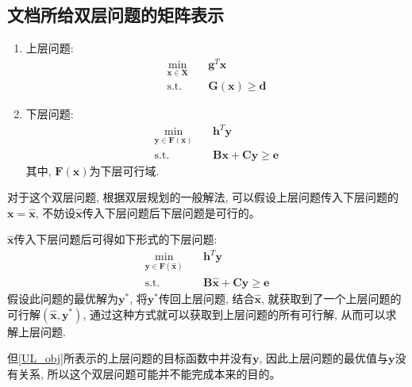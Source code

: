 \documentclass{article}
\begin{document}
\subsection{文档所给双层问题的矩阵表示}
\begin{enumerate}
    \item {上层问题:
        \begin{align}
            \min\limits_{\boldsymbol{x}\in\boldsymbol{X}}\quad & \boldsymbol{g}^T\boldsymbol{x}  \label{UL_obj} \\
            \mathrm{s.t.}\quad &\boldsymbol{G(x)}\geq \boldsymbol{d}  \label{UL_con1} 
        \end{align}
    }
    \item {下层问题:
        \begin{align}
            \min\limits_{\boldsymbol{y}\in\boldsymbol{F(x)}}\quad & \boldsymbol{h}^T\boldsymbol{y} \\
            \mathrm{s.t.}\quad &\boldsymbol{Bx}+\boldsymbol{Cy}\geq \boldsymbol{e}
        \end{align}
        其中, $\boldsymbol{F(x)}$为下层可行域.
    }
\end{enumerate}

对于这个双层问题, 根据双层规划的一般解法, 可以假设上层问题传入下层问题的$\boldsymbol{x}=\boldsymbol{\hat{x}}$, 不妨设$\boldsymbol{\hat{x}}$传入下层问题后下层问题是可行的。

$\boldsymbol{\hat{x}}$传入下层问题后可得如下形式的下层问题:
\begin{align}
    \min\limits_{\boldsymbol{y}\in\boldsymbol{F(\hat{x})}}\quad & \boldsymbol{h}^T\boldsymbol{y} \\
    \mathrm{s.t.}\quad &\boldsymbol{B\hat{x}}+\boldsymbol{Cy}\geq \boldsymbol{e}
\end{align}
假设此问题的最优解为$\boldsymbol{y^*}$, 将$\boldsymbol{y^*}$传回上层问题, 结合$\boldsymbol{\hat{x}}$, 就获取到了一个上层问题的可行解$(\boldsymbol{\hat{x}},\boldsymbol{y^*})$, 通过这种方式就可以获取到上层问题的所有可行解, 从而可以求解上层问题.

但\eqref{UL_obj}所表示的上层问题的目标函数中并没有$\boldsymbol{y}$, 因此上层问题的最优值与$\boldsymbol{y}$没有关系, 所以这个双层问题可能并不能完成本来的目的。
\end{document}
